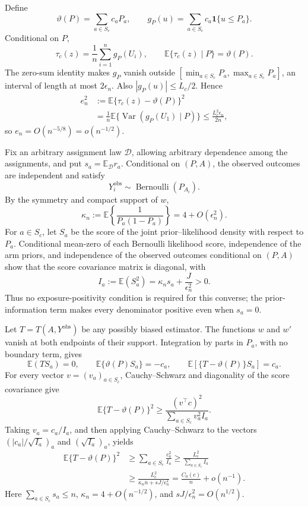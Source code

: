 Define
\[
 \vartheta(P)=\sum_{a\in S_c}c_aP_a,
 \qquad
 g_P(u)=\sum_{a\in S_c}c_a\mathbf 1\{u\leq P_a\}.
\]
Conditional on \(P\),
\[
 \tau_c(z)=\frac1n\sum_{i=1}^ng_P(U_i),
 \qquad
 \mathbb E\{\tau_c(z)\mid P\}=\vartheta(P).
\]
The zero-sum identity makes \(g_P\) vanish outside
\([\min_{a\in S_c}P_a,\max_{a\in S_c}P_a]\), an interval of length at most \(2\epsilon_n\).  Also \(|g_P(u)|\leq L_c/2\).  Hence
\[
 \begin{aligned}
 e_n^2
 &:=\mathbb E\{\tau_c(z)-\vartheta(P)\}^2\\
 &=\frac1n\mathbb E\{\operatorname{Var}(g_P(U_1)\mid P)\}
 \leq\frac{L_c^2\epsilon_n}{2n},
 \end{aligned}
\]
so \(e_n=O(n^{-5/8})=o(n^{-1/2})\).

Fix an arbitrary assignment law \(\mathcal D\), allowing arbitrary dependence among the assignments, and put \(s_a=\mathbb E_{\mathcal D}r_a\).  Conditional on \((P,A)\), the observed outcomes are independent and satisfy
\[
 Y_i^{\mathrm{obs}}\sim\operatorname{Bernoulli}(P_{A_i}).
\]
By the symmetry and compact support of \(w\),
\[
 \kappa_n
 :=\mathbb E\!\left\{\frac1{P_a(1-P_a)}\right\}
 =4+O(\epsilon_n^2).
\]
For \(a\in S_c\), let \(S_a\) be the score of the joint prior--likelihood density with respect to \(P_a\).  Conditional mean-zero of each Bernoulli likelihood score, independence of the arm priors, and independence of the observed outcomes conditional on \((P,A)\) show that the score covariance matrix is diagonal, with
\[
 I_a:=\mathbb E(S_a^2)
 =\kappa_ns_a+\frac{J}{\epsilon_n^2}>0.
\]
Thus no exposure-positivity condition is required for this converse; the prior-information term makes every denominator positive even when \(s_a=0\).

Let \(T=T(A,Y^{\mathrm{obs}})\) be any possibly biased estimator.  The functions \(w\) and \(w'\) vanish at both endpoints of their support.  Integration by parts in \(P_a\), with no boundary term, gives
\[
 \mathbb E(TS_a)=0,
 \qquad
 \mathbb E\{\vartheta(P)S_a\}=-c_a,
 \qquad
 \mathbb E[\{T-\vartheta(P)\}S_a]=c_a.
\]
For every vector \(v=(v_a)_{a\in S_c}\), Cauchy--Schwarz and diagonality of the score covariance give
\[
 \mathbb E\{T-\vartheta(P)\}^2
 \geq\frac{(v^\top c)^2}{\sum_{a\in S_c}v_a^2I_a}.
\]
Taking \(v_a=c_a/I_a\), and then applying Cauchy--Schwarz to the vectors \((|c_a|/\sqrt{I_a})_a\) and \((\sqrt{I_a})_a\), yields
\[
 \begin{aligned}
 \mathbb E\{T-\vartheta(P)\}^2
 &\geq\sum_{a\in S_c}\frac{c_a^2}{I_a}
 \geq\frac{L_c^2}{\sum_{a\in S_c}I_a}\\
 &\geq\frac{L_c^2}{\kappa_n n+sJ/\epsilon_n^2}
 =\frac{C_0(c)}n+o(n^{-1}).
 \end{aligned}
\]
Here \(\sum_{a\in S_c}s_a\leq n\), \(\kappa_n=4+O(n^{-1/2})\), and \(sJ/\epsilon_n^2=O(n^{1/2})\).

